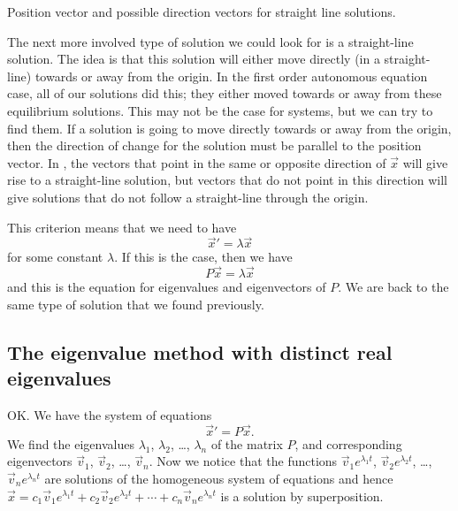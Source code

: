 \documentclass{ximera}
\begin{document}
\begin{mywrapfig}{3.25in}
    \capstart
    \caption{Position vector and possible direction vectors for straight line solutions.\label{posdir:source-eigfig}}
\end{mywrapfig}

The next more involved type of solution we could look for is a straight-line solution. The idea is that this solution will either move directly (in a straight-line) towards or away from the origin. In the first order autonomous equation case, all of our solutions did this; they either moved towards or away from these equilibrium solutions. This may not be the case for systems, but we can try to find them. If a solution is going to move directly towards or away from the origin, then the direction of change for the solution must be parallel to the position vector. In , the vectors that point in the same or opposite direction of $\vec{x}$ will give rise to a straight-line solution, but vectors that do not point in this direction will give solutions that do not follow a straight-line through the origin. 

This criterion means that we need to have 
\begin{equation*}
    \vec{x}' = \lambda \vec{x}
\end{equation*}
for some constant $\lambda$. If this is the case, then we have 
\begin{equation*}
    P\vec{x} = \lambda \vec{x}
\end{equation*}
and this is the equation for eigenvalues and eigenvectors of $P$. We are back to the same type of solution that we found previously.

\subsection{The eigenvalue method with distinct real eigenvalues}

OK\@.  We have the system of equations
\begin{equation*}
    {\vec{x}}' = P\vec{x} .
\end{equation*}
We find the eigenvalues $\lambda_1$, $\lambda_2$, \ldots, $\lambda_n$ of the matrix $P$, and corresponding eigenvectors $\vec{v}_1$, $\vec{v}_2$, \ldots, $\vec{v}_n$. Now we notice that the functions $\vec{v}_1 e^{\lambda_1 t}$, $\vec{v}_2 e^{\lambda_2 t}$, \ldots, $\vec{v}_n e^{\lambda_n t}$ are solutions of the homogeneous system of equations and hence $\vec{x} = c_1 \vec{v}_1 e^{\lambda_1 t} + c_2 \vec{v}_2 e^{\lambda_2 t} + \cdots + c_n \vec{v}_n e^{\lambda_n t}$ is a solution by superposition.
\end{document}
